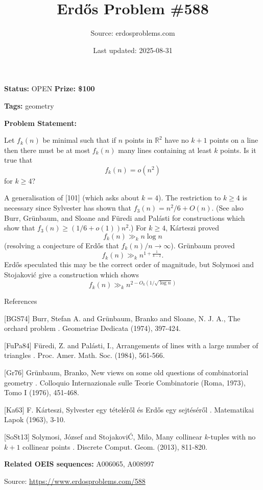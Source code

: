 \documentclass{article}
\title{Erd\H{o}s Problem \#588}
\date{Last updated: 2025-08-31}
\author{Source: erdosproblems.com}
\begin{document}
\maketitle

\noindent\textbf{Status:} OPEN \quad \textbf{Prize: \$100}

\noindent\textbf{Tags:} geometry

\medskip

\noindent\textbf{Problem Statement:}

Let $f_k(n)$ be minimal such that if $n$ points in $\mathbb{R}^2$ have no $k+1$ points on a line then there must be at most $f_k(n)$ many lines containing at least $k$ points. Is it true that\[f_k(n)=o(n^2)\]for $k\geq 4$?




A generalisation of [101] (which asks about $k=4$). The restriction to $k\geq 4$ is necessary since Sylvester has shown that $f_3(n)= n^2/6+O(n)$. (See also Burr, Gr\"{u}nbaum, and Sloane \cite{BGS74} and F\"{u}redi and Pal\'{a}sti \cite{FuPa84} for constructions which show that $f_3(n)\geq(1/6+o(1))n^2$.) For $k\geq 4$, K\'{a}rteszi \cite{Ka63} proved\[f_k(n)\gg_k n\log n\](resolving a conjecture of Erd\H{o}s that $f_k(n)/n\to \infty$). Gr\"{u}nbaum \cite{Gr76} proved\[f_k(n) \gg_k n^{1+\frac{1}{k-2}}.\]Erd\H{o}s speculated this may be the correct order of magnitude, but Solymosi and Stojakovi\'{c} \cite{SoSt13} give a construction which shows\[f_k(n)\gg_k n^{2-O_k(1/\sqrt{\log n})}\]




References

[BGS74] Burr, Stefan A. and Gr\"{u}nbaum, Branko and Sloane, N. J. A., The orchard problem . Geometriae Dedicata (1974), 397-424.

[FuPa84] F\"{u}redi, Z. and Pal\'{a}sti, I., Arrangements of lines with a large number of triangles . Proc. Amer. Math. Soc. (1984), 561-566.

[Gr76] Gr\"{u}nbaum, Branko, New views on some old questions of combinatorial geometry . Colloquio Internazionale sulle Teorie Combinatorie (Roma, 1973), Tomo I (1976), 451-468.

[Ka63] F. K\'{a}rteszi, Sylvester egy t\'{e}tel\'{e}r\H{o}l \'{e}s Erd\H{o}s egy sejt\'{e}s\'{e}r\H{o}l . Matematikai Lapok (1963), 3-10.

[SoSt13] Solymosi, J\'{o}zsef and Stojakovi\'C, Milo\vS, Many collinear {$k$}-tuples with no {$k+1$} collinear points . Discrete Comput. Geom. (2013), 811-820.

\noindent\textbf{Related OEIS sequences:} A006065, A008997


\bigskip
\noindent\small{Source: \url{https://www.erdosproblems.com/588}}
\end{document}
